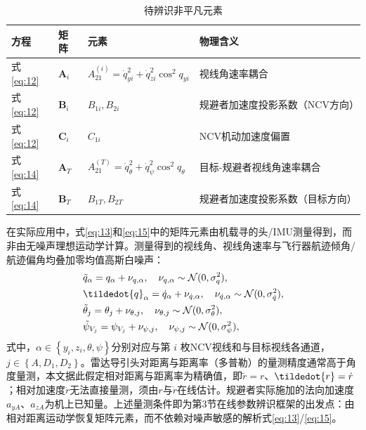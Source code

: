 \begin{table}[htbp]
\centering
\caption{待辨识非平凡元素}
\label{tab:nontrivial}
\small
\begin{tabularx}{\linewidth}{lXXX}
\toprule
方程 & 矩阵 & 元素 & 物理含义 \\
\midrule
式\eqref{eq:12} & ${{\mathbf{A}}_i}$ & $A_{21}^{(i)} = \dot q_{yi}^2 + \dot q_{zi}^2{\cos ^2}{q_{yi}}$ & 视线角速率耦合 \\
式\eqref{eq:12} & ${{\mathbf{B}}_i}$ & ${B_{1i}},{B_{2i}}$ & 规避者加速度投影系数（NCV方向） \\
式\eqref{eq:12} & ${{\mathbf{C}}_i}$ & ${C_{1i}}$ & NCV机动加速度偏置 \\
式\eqref{eq:14} & ${{\mathbf{A}}_T}$ & $A_{21}^{(T)} = \dot q_\theta ^2 + \dot q_\psi ^2{\cos ^2}{q_\theta }$ & 目标-规避者视线角速率耦合 \\
式\eqref{eq:14} & ${{\mathbf{B}}_T}$ & ${B_{1T}},{B_{2T}}$ & 规避者加速度投影系数（目标方向） \\
\bottomrule
\end{tabularx}
\end{table}
\begin{remarka}[量测条件]
\label{rmk:meas-noise}
在实际应用中，式\eqref{eq:13}和\eqref{eq:15}中的矩阵元素由机载寻的头/IMU测量得到，而非由无噪声理想运动学计算。测量得到的视线角、视线角速率与飞行器航迹倾角/航迹偏角均叠加零均值高斯白噪声：
\begin{equation}
\label{eq:16}
\begin{gathered}
  \tilde{q}_{\alpha} = {q_{\alpha}} + {\nu _{q,\alpha }},\quad {\nu _{q,\alpha }}\sim \mathcal{N}(0,\sigma _q^2), \hfill \\
  \tildedot{q}_{\alpha} = \dot{q}_{\alpha} + {\nu _{\dot q,\alpha }},\quad {\nu _{\dot q,\alpha }}\sim \mathcal{N}(0,\sigma _{\dot q}^2), \hfill \\
  \tilde{\theta}_{j} = {\theta _{j}} + {\nu _{\theta ,j}},\quad {\nu _{\theta ,j}}\sim \mathcal{N}(0,\sigma _\theta ^2), \hfill \\
  \tilde{\psi}_{V_{j}} = {\psi _{V_{j}}} + {\nu _{\psi ,j}},\quad {\nu _{\psi ,j}}\sim \mathcal{N}(0,\sigma _\psi ^2), \hfill \\ 
\end{gathered}
\end{equation}
式中，$\alpha  \in \left\{ {{y_i},{z_i},\theta ,\psi } \right\}$分别对应与第 $i$ 枚NCV视线和与目标视线各通道，$j \in \left\{ {A,{D_1},{D_2}} \right\}$。雷达导引头对距离与距离率（多普勒）的量测精度通常高于角度量测，本文据此假定相对距离与距离率为精确值，即$\tilde{r} = r$、$\tildedot{r} = \dot{r}$；相对加速度$\ddot{r}$无法直接量测，须由$r$与$\dot{r}$在线估计。规避者实际施加的法向加速度${a_{yA}}$、${a_{zA}}$为机上已知量。上述量测条件即为第3节在线参数辨识框架的出发点：由相对距离运动学恢复矩阵元素，而不依赖对噪声敏感的解析式\eqref{eq:13}/\eqref{eq:15}。
\end{remarka}

